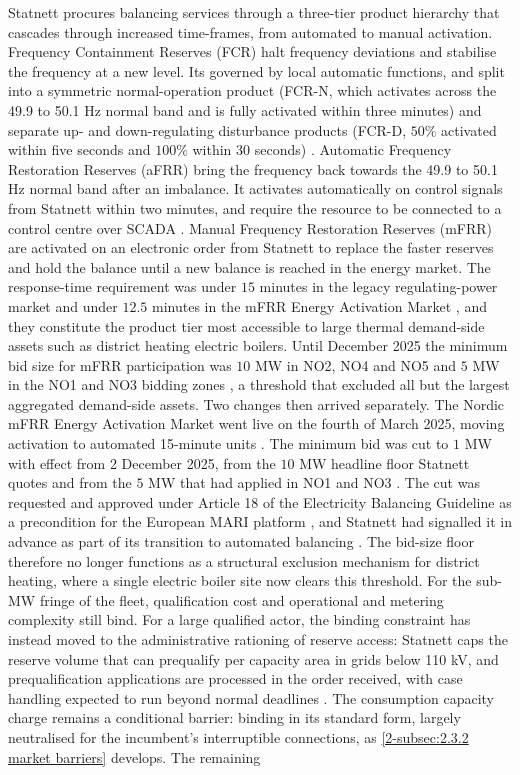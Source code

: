 Statnett procures balancing services through a three-tier product hierarchy that cascades through increased time-frames, from automated to manual activation. Frequency Containment Reserves (FCR) halt frequency deviations and stabilise the frequency at a new level. Its governed by local automatic functions, and split into a symmetric normal-operation product (FCR-N, which activates across the 49.9 to 50.1 Hz normal band and is fully activated within three minutes) and separate up- and down-regulating disturbance products (FCR-D, $50\%$ activated within five seconds and $100\%$ within $30$ seconds) \cite{dalen_fleksibilitet_nodate}. Automatic Frequency Restoration Reserves (aFRR) bring the frequency back towards the 49.9 to 50.1 Hz normal band after an imbalance. It activates automatically on control signals from Statnett within two minutes, and require the resource to be connected to a control centre over SCADA \cite{dalen_fleksibilitet_nodate}. Manual Frequency Restoration Reserves (mFRR) are activated on an electronic order from Statnett to replace the faster reserves and hold the balance until a new balance is reached in the energy market. The response-time requirement was under $15$ minutes in the legacy regulating-power market and under $12.5$ minutes in the mFRR Energy Activation Market \cite{dalen_fleksibilitet_nodate}, and they constitute the product tier most accessible to large thermal demand-side assets such as district heating electric boilers. Until December 2025 the minimum bid size for mFRR participation was $10$ MW in NO2, NO4 and NO5 and $5$ MW in the NO1 and NO3 bidding zones \cite{dalen_fleksibilitet_nodate}, a threshold that excluded all but the largest aggregated demand-side assets. Two changes then arrived separately. The Nordic mFRR Energy Activation Market went live on the fourth of March 2025, moving activation to automated 15-minute units \cite{solberg_manedsrapport_nodate}. The minimum bid was cut to $1$ MW with effect from 2 December 2025, from the $10$ MW headline floor Statnett quotes and from the $5$ MW that had applied in NO1 and NO3 \cite{dalen_fleksibilitet_nodate}. The cut was requested and approved under Article 18 of the Electricity Balancing Guideline as a precondition for the European MARI platform \cite{statnett_1_2025, statnett_forslag_2025}, and Statnett had signalled it in advance as part of its transition to automated balancing \cite{dalen_fleksibilitet_nodate}. The bid-size floor therefore no longer functions as a structural exclusion mechanism for district heating, where a single electric boiler site now clears this threshold. For the sub-MW fringe of the fleet, qualification cost and operational and metering complexity still bind. For a large qualified actor, the binding constraint has instead moved to the administrative rationing of reserve access: Statnett caps the reserve volume that can prequalify per capacity area in grids below 110 kV, and prequalification applications are processed in the order received, with case handling expected to run beyond normal deadlines \cite{statnett_innforing_2026}. The consumption capacity charge remains a conditional barrier: binding in its standard form, largely neutralised for the incumbent's interruptible connections, as \autoref{2-subsec:2.3.2 market barriers} develops. The remaining 